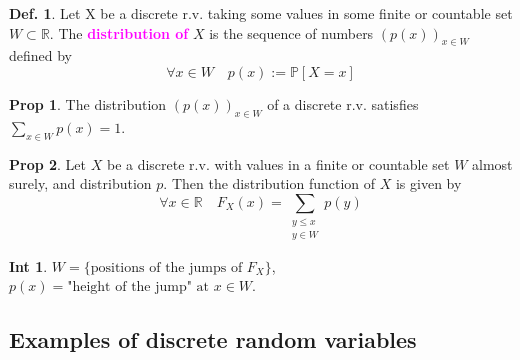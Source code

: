 \documentclass[8pt,a4paper,landscape]{article}
\theoremstyle{definition}
\newtheorem{definition}{Def.}[section]
\theoremstyle{example}
\theoremstyle{intuition}
\newtheorem*{intuition}{Int}
\theoremstyle{definition}
\newtheorem{proposition}{Prop}[section]
\newcommand{\mydef}[1]{\textcolor{magenta}{\textbf{#1}}}
\newcommand{\prob}[1]{\mathbb{P}\left[ #1 \right]}
\begin{document}
\begin{multicols}{3}
			\begin{definition}
				Let X be a discrete r.v. taking some values in some finite or countable set $W \subset \mathbb{R}$. The \mydef{distribution of} $X$ is the sequence of numbers $(p(x))_{x \in W}$ defined by 
				$$
					\forall x \in W \quad p(x) := \prob{X = x}
				$$
			\end{definition}

			\begin{proposition}
				The distribution $(p(x))_{x \in W}$ of a discrete r.v. satisfies $\sum_{x \in W} p(x) = 1$.
			\end{proposition}

			\begin{proposition}
				Let $X$ be a discrete r.v. with values in a finite or countable set $W$ almost surely, and distribution $p$. Then the distribution function of $X$ is given by
				$$
				\forall x \in \mathbb{R} \quad F_X(x) = \sum_{\substack{y \leq x \\ y \in W}} p(y)
				$$
			\end{proposition}

			\begin{intuition}
				$W = \{\text{positions of the jumps of } F_X\}$,\\
				$p(x) = \text{"height of the jump" at } x \in W$.
			\end{intuition}


		\subsection{Examples of discrete random variables}


	
\end{multicols}	
\end{document}
